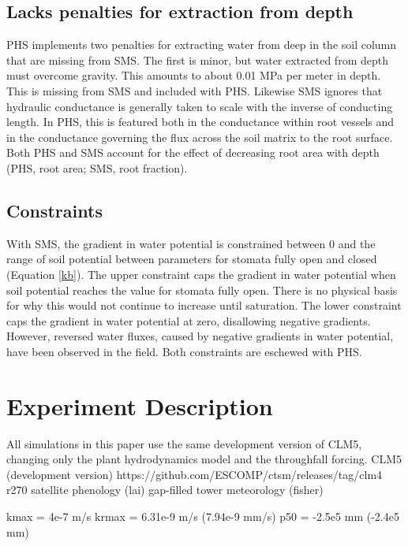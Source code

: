 \documentclass[draft,linenumbers]{agujournal}
\begin{document}
    \subsection{Lacks penalties for extraction from depth}
    PHS implements two penalties for extracting water from deep in the soil column that are missing from SMS.
    The first is minor, but water extracted from depth must overcome gravity. 
    This amounts to about 0.01 MPa per meter in depth. 
    This is missing from SMS and included with PHS. 
    Likewise SMS ignores that hydraulic conductance is generally taken to scale with the inverse of conducting length.
    In PHS, this is featured both in the conductance within root vessels and 
    in the conductance governing the flux across the soil matrix to the root surface.
    Both PHS and SMS account for the effect of decreasing root area with depth (PHS, root area; SMS, root fraction).
    
    \subsection{Constraints}
    With SMS, the gradient in water potential is constrained between 0 and 
    the range of soil potential between parameters for stomata fully open and closed (Equation \ref{kb}). 
    The upper constraint caps the gradient in water potential when soil potential reaches the value for stomata fully open.
    There is no physical basis for why this would not continue to increase until saturation.
    The lower constraint caps the gradient in water potential at zero, disallowing negative gradients.
    However, reversed water fluxes, caused by negative gradients in water potential, have been observed in the field.
    Both constraints are eschewed with PHS.     

\section{Experiment Description}
    All simulations in this paper use the same development version of CLM5, changing only the plant hydrodynamics model and the throughfall forcing.
CLM5 (development version) 
https://github.com/ESCOMP/ctsm/releases/tag/clm4
\textunderscore r270
satellite phenology (lai)
gap-filled tower meteorology (fisher)

kmax =  4e-7 m/s
krmax = 6.31e-9 m/s (7.94e-9 mm/s)
p50 = -2.5e5 mm (-2.4e5 mm)
\end{document}
